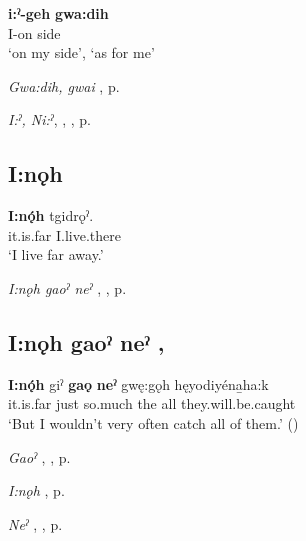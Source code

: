 \ea
\label{ex:ipar1}
\gll \textbf{i:ˀ-geh} \textbf{gwa:dih}\\
I-on side\\
\glt ‘on my side’, ‘as for me’
\z


\begin{CayugaRelated}
\item \textit{Gwa:dih, gwai} , p. \pageref{p:[gwa:dih]}\\
\item \textit{I:ˀ, Ni:ˀ}, , , p. \pageref{p:[i:ˀ]}
\end{CayugaRelated}


\subsection*{\textbf{I:nǫh} } \label{p:[i:nǫh]}

\ea
\label{ex:ipar5}
\gll \textbf{I:nǫ́h} tgidrǫˀ.\\
it.is.far I.live.there\\
\glt ‘I live far away.’
\z

\begin{CayugaRelated}
\item \textit{I:nǫh gaoˀ neˀ} , , p. \pageref{p:[i:nǫh gaoˀ neˀ]}
\end{CayugaRelated}


\subsection*{\textbf{I:nǫh gaoˀ neˀ} , } \label{p:[i:nǫh gaoˀ neˀ]}

\ea
\label{ex:ipar6}
\gll \textbf{I:nǫ́h} giˀ \textbf{gaǫ} \textbf{neˀ} gwę:gǫh hęyodiyéna̱ha:k\\
it.is.far just so.much the all they.will.be.caught\\
\glt ‘But I wouldn’t very often catch all of them.’ (\cite{mithun_how_1980})
\z

\begin{CayugaRelated}
\item \textit{Gaoˀ} , , p. \pageref{p:[gaoˀ]}\\
\item \textit{I:nǫh} , p. \pageref{p:[i:nǫh]}\\
\item \textit{Neˀ} , , p. \pageref{p:[neˀ]}
\end{CayugaRelated}


